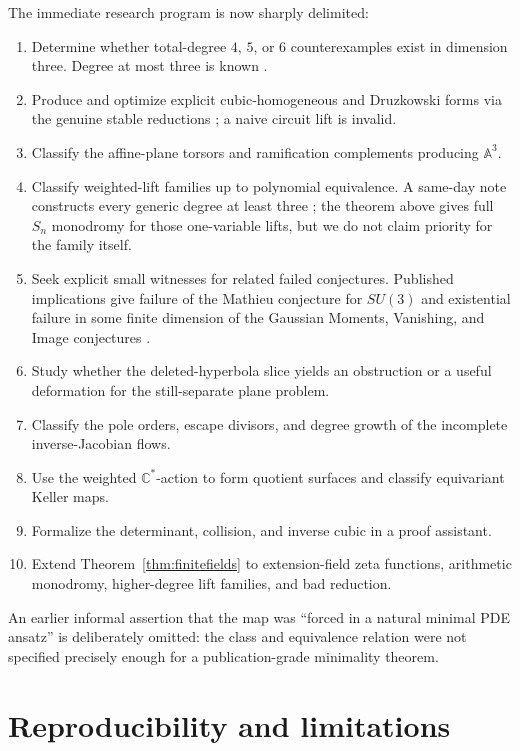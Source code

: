 \documentclass[11pt]{article}
\theoremstyle{remark}
\newcommand{\A}{\mathbb A}
\newcommand{\C}{\mathbb C}
\begin{document}
The immediate research program is now sharply delimited:
\begin{enumerate}
\item Determine whether total-degree $4$, $5$, or $6$ counterexamples exist in
dimension three. Degree at most three is known \cite{wright1993,vistoli}.
\item Produce and optimize explicit cubic-homogeneous and Druzkowski forms via
the genuine stable reductions \cite{bcw}; a naive circuit lift is invalid.
\item Classify the affine-plane torsors and ramification complements producing
$\A^3$.
\item Classify weighted-lift families up to polynomial equivalence. A same-day
note constructs every generic degree at least three \cite{gallagher}; the
theorem above gives full $S_n$ monodromy for those one-variable lifts, but we
do not claim priority for the family itself.
\item Seek explicit small witnesses for related failed conjectures. Published
implications give failure of the Mathieu conjecture for $SU(3)$ and
existential failure in some finite dimension of the Gaussian Moments,
Vanishing, and Image conjectures \cite{mathieu,zwart,gaussian,zhao,image}.
\item Study whether the deleted-hyperbola slice yields an obstruction or a
useful deformation for the still-separate plane problem.
\item Classify the pole orders, escape divisors, and degree growth of the
incomplete inverse-Jacobian flows.
\item Use the weighted $\C^*$-action to form quotient surfaces and classify
equivariant Keller maps.
\item Formalize the determinant, collision, and inverse cubic in a proof
assistant.
\item Extend Theorem~\ref{thm:finitefields} to extension-field zeta functions,
arithmetic monodromy, higher-degree lift families, and bad reduction.
\end{enumerate}

An earlier informal assertion that the map was ``forced in a natural minimal
PDE ansatz'' is deliberately omitted: the class and equivalence relation were
not specified precisely enough for a publication-grade minimality theorem.

\section{Reproducibility and limitations}
\end{document}
